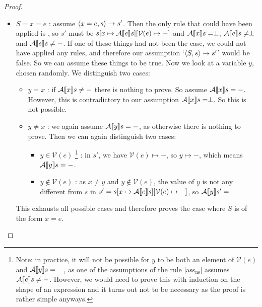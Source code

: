 \begin{proof}
\begin{itemize}[noitemsep]
    \item $S = x = e$ : assume $\langle x = e, s \rangle \to s'$. Then the only rule that could have been applied is \assns, so  $s'$ must be $s[x \mapsto \mathcal{A} \llbracket e \rrbracket s][\mathcal{V}(e)\mapsto-]$ and $\mathcal{A} \llbracket x \rrbracket s = \perp$, $\mathcal{A} \llbracket e \rrbracket s \neq \perp$ and $\mathcal{A} \llbracket e \rrbracket s \neq -$. If one of these things had not been the case, we could not have applied any rules, and therefore our assumption `$\langle S, s \rangle \to s'$' would be false. So we can assume these things to be true. Now we look at a variable $y$, chosen randomly. We distinguish two cases:
    \begin{itemize}[noitemsep]
        \item $y=x$ : if $\mathcal{A} \llbracket x \rrbracket s \not = -$ there is nothing to prove. So assume $\mathcal{A} \llbracket x \rrbracket s = -$. However, this is contradictory to our assumption $\mathcal{A} \llbracket x \rrbracket s = \perp$. So this is not possible.
        \item $y\not = x$ : we again assume $\mathcal{A} \llbracket y \rrbracket s = -$, as otherwise there is nothing to prove. Then we can again distinguish two cases: 
        \begin{itemize}[noitemsep]
            \item $y \in \mathcal{V}(e)$ \footnote{Note: in practice, it will not be possible for $y$ to be both an element of $\mathcal{V}(e)$ and $\mathcal{A} \llbracket y \rrbracket s = -$, as one of the assumptions of the rule [ass$_{\textrm{ns}}$] assumes $\mathcal{A} \llbracket e \rrbracket s \neq -$. However, we would need to prove this with induction on the shape of an expression and it turns out not to be necessary as the proof is rather simple anyways.} : in $s'$, we have $\mathcal{V}(e)\mapsto-$, so $y \mapsto -$, which means $\mathcal{A} \llbracket y \rrbracket s = -$.
            \item $y \not \in \mathcal{V}(e)$ : as $x \not = y$ and $y \not \in \mathcal{V}(e)$, the value of $y$ is not any different from $s$ in $s'=s[x \mapsto \mathcal{A} \llbracket e \rrbracket s][\mathcal{V}(e)\mapsto-]$, so $\mathcal{A} \llbracket y \rrbracket s' = -$
        \end{itemize}
    \end{itemize}
    This exhausts all possible cases and therefore proves the case where $S$ is of the form $x = e$.
    

\end{itemize}
\end{proof}
